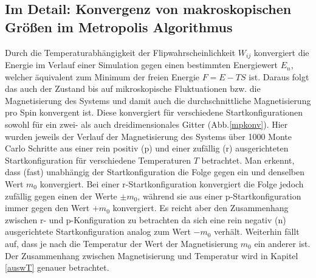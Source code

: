 \subsection{Im Detail: Konvergenz von makroskopischen Größen im Metropolis Algorithmus}

Durch die Temperaturabhängigkeit der Flipwahrscheinlichkeit $W_{ij}$ konvergiert die Energie im Verlauf einer Simulation gegen einen bestimmten Energiewert $E_{n}$, welcher äquivalent zum Minimum der freien Energie $F=E-TS$ ist. Daraus folgt das auch der Zustand bis auf mikroskopische Fluktuationen bzw. die Magnetisierung des Systems und damit auch die durchschnittliche Magnetisierung pro Spin konvergent ist. Diese konvergiert für verschiedene Startkonfigurationen sowohl für ein zwei- als auch dreidimensionales Gitter (Abb.\ref{mpkonv}). Hier wurden jeweils der Verlauf der Magnetisierung des Systems über 1000 Monte Carlo Schritte aus einer rein positiv (p) und einer zufällig (r) ausgerichteten Startkonfiguration für verschiedene Temperaturen $T$ betrachtet. Man erkennt, dass (fast) unabhängig der Startkonfiguration die Folge gegen ein und denselben Wert $m_0$ konvergiert. Bei einer r-Startkonfiguration konvergiert die Folge jedoch zufällig gegen einen der Werte $\pm m_0$, während sie aus einer p-Startkonfiguration immer gegen den Wert $+m_0$ konvergiert. Es reicht aber den Zusammenhang zwischen r- und p-Konfiguration zu betrachten da sich eine rein negativ (n) ausgerichtete Startkonfiguration analog zum Wert $-m_0$ verhält. Weiterhin fällt auf, dass je nach die Temperatur der Wert der Magnetisierung $m_0$ ein anderer ist. Der Zusammenhang zwischen Magnetisierung und Temperatur wird in Kapitel \ref{auswT} genauer betrachtet.
